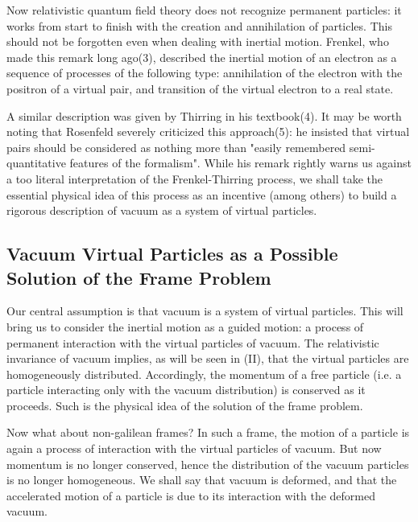 \documentclass[a4paper,11pt]{article}
\begin{document}


Now relativistic quantum field theory does not recognize permanent particles: it works from 
start to finish with the creation and annihilation of particles. This should not be forgotten 
even when dealing  with inertial motion. Frenkel, who made this remark long ago(3), described the 
inertial motion of an electron as a sequence of processes of the following type: annihilation 
of the electron with the positron of a virtual pair, and transition of the virtual electron to 
a real state.

A similar description was given by Thirring in his textbook(4). It may be worth 
noting that Rosenfeld severely criticized this approach(5): he insisted that virtual pairs 
should be considered as nothing more than "easily remembered semi-quantitative features of the 
formalism". While his remark rightly warns us against a too literal interpretation of the 
Frenkel-Thirring process, we shall take the essential physical idea of this process as an 
incentive (among others) to build a rigorous description of vacuum as a system of virtual 
particles.

\subsection{Vacuum Virtual Particles as a Possible Solution of the Frame Problem}

Our central assumption is that vacuum is a system of virtual particles. This will bring us to 
consider the inertial motion as a guided motion: a process of permanent interaction with the 
virtual particles of vacuum. 
The relativistic invariance of vacuum implies, as will be seen in (II), that the virtual 
particles are homogeneously distributed. Accordingly, the momentum of a free particle (i.e. a 
particle interacting only with the vacuum distribution) is conserved as it proceeds. Such is 
the physical idea of the solution of the frame problem.

 Now what about non-galilean frames? In such a frame, the motion of a particle is again a 
process of interaction with the virtual particles of vacuum. But now momentum is no longer 
conserved, hence the distribution of the vacuum particles is no longer homogeneous. We shall 
say that vacuum is deformed, and that the accelerated motion of a particle is due to its 
interaction with the deformed vacuum.
\end{document}

